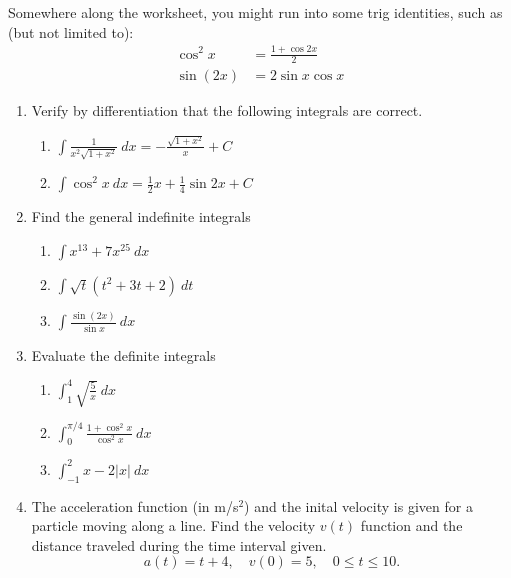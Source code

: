 \documentclass[letterpaper,11pt]{article}
\begin{document}
Somewhere along the worksheet, you might run into some trig identities, such as (but not limited to):
\begin{align*}
    \cos^2{x} & = \frac{1+ \cos{2x}}{2}\\
    \sin(2x) & = 2\sin{x}\cos{x}
\end{align*}
\begin{enumerate}
    \item Verify by differentiation that the following integrals are correct. 
    \begin{enumerate}
        \item $\displaystyle \int \frac{1}{x^2 \sqrt{1+x^2}} \ dx = -\frac{\sqrt{1+x^2}}{x} + C$
        \vfill
        \item $\displaystyle \int \cos^2{x} \ dx = \frac{1}{2} x + \frac{1}{4} \sin{2x} + C$
        \vfill
    \end{enumerate}
    \newpage
    \item Find the general indefinite integrals
    \begin{enumerate}
        \item $\displaystyle \int x^{13} + 7x^{25} \ dx$
        \vfill
        \item $\displaystyle \int \sqrt{t}(t^2 + 3t + 2) \ dt$
        \vfill
        \item $\displaystyle \int \frac{\sin(2x)}{\sin{x}} \ dx$
        \vfill
    \end{enumerate}
    \newpage

    \item Evaluate the definite integrals
    \begin{enumerate}
        \item $\displaystyle \int_1^4 \sqrt{\frac{5}{x}} \ dx$
        \vfill
        \item $\displaystyle \int_0^{\pi/4} \frac{1+\cos^2{x}}{\cos^2{x}} \ dx$
        \vfill
        \item $\displaystyle \int_{-1}^2 x - 2|x| \ dx$
        \vfill
    \end{enumerate}
    \newpage
    \item The acceleration function (in m/s$^2$) and the inital velocity is given for a particle moving along a line. Find the velocity $v(t)$ function and the distance traveled during the time interval given.
    \[a(t) = t+4, \quad v(0) = 5, \quad 0 \leq t \leq 10.\]
    \vfill
\end{enumerate}
\end{document}
